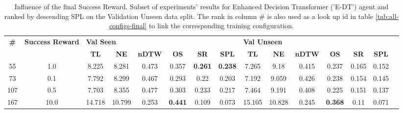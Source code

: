 \begin{table}
\centering
\caption{\label{tab:e_dt_reward_scale}Influence of the final Success Reward. Subset of experiments' results for Enhanced Decision Transformer ('E-DT') agent and ranked by descending SPL on the Validation Unseen data split. The rank in column \# is also used as a look up id in table \ref{tab:all-configs-final} to link the corresponding training configuration.}
\begin{tabular}{@{\hskip3pt}c@{\hskip3pt}c@{\hskip3pt}c@{\hskip3pt}c@{\hskip3pt}c@{\hskip3pt}c@{\hskip3pt}c@{\hskip3pt}c@{\hskip3pt}c@{\hskip3pt}c@{\hskip3pt}c@{\hskip3pt}c@{\hskip3pt}c@{\hskip3pt}c@{\hskip3pt}c}
\toprule
\textbf{\#} & \textbf{Success Reward } & \multicolumn{6}{l}{\textbf{Val Seen}} & \multicolumn{6}{l}{\textbf{Val Unseen}} \\
 \textbf{~} &               \textbf{~} &       \textbf{TL} & \textbf{NE} & \textbf{nDTW} &     \textbf{OS} &     \textbf{SR} &    \textbf{SPL} &         \textbf{TL} & \textbf{NE} & \textbf{nDTW} &     \textbf{OS} & \textbf{SR} & \textbf{SPL} \\
\midrule
         55 &                      1.0 &             8.225 &       8.281 &         0.473 &           0.357 &  \textbf{0.261} &  \textbf{0.238} &               7.265 &        9.18 &         0.415 &           0.237 &       0.165 &        0.152 \\
         73 &                      0.1 &             7.792 &       8.299 &         0.467 &           0.293 &            0.22 &           0.203 &               7.192 &       9.059 &         0.426 &           0.238 &       0.154 &        0.145 \\
        107 &                      0.5 &             7.703 &       8.355 &         0.477 &           0.303 &           0.233 &           0.217 &               7.464 &       9.191 &         0.408 &           0.225 &       0.151 &        0.137 \\
        167 &                     10.0 &            14.718 &      10.799 &         0.253 &  \textbf{0.441} &           0.109 &           0.073 &              15.105 &      10.828 &         0.245 &  \textbf{0.368} &        0.11 &        0.071 \\
\bottomrule
\end{tabular}
\end{table}
